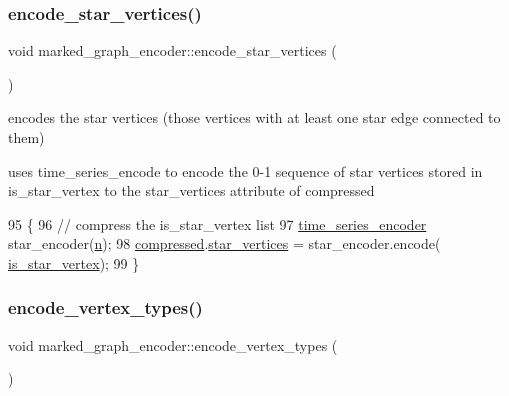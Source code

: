 \subsubsection{\texorpdfstring{encode\+\_\+star\+\_\+vertices()}{encode\_star\_vertices()}}
{\footnotesize\ttfamily void marked\+\_\+graph\+\_\+encoder\+::encode\+\_\+star\+\_\+vertices (\begin{DoxyParamCaption}{ }\end{DoxyParamCaption})\hspace{0.3cm}{\ttfamily [private]}}



encodes the star vertices (those vertices with at least one star edge connected to them) 

uses time\+\_\+series\+\_\+encode to encode the 0-\/1 sequence of star vertices stored in is\+\_\+star\+\_\+vertex to the star\+\_\+vertices attribute of compressed 
\begin{DoxyCode}
95 \{
96   \textcolor{comment}{// compress the is\_star\_vertex list}
97   \hyperlink{classtime__series__encoder}{time\_series\_encoder} star\_encoder(\hyperlink{classmarked__graph__encoder_a4c66d9fdbc14c97523715aac7e4511cb}{n});
98   \hyperlink{classmarked__graph__encoder_ac2ded200860fdd2321f86dd76b28bcb3}{compressed}.\hyperlink{classmarked__graph__compressed_a7a4ced4586e2e353f9076bd447df5208}{star\_vertices} = star\_encoder.encode(
      \hyperlink{classmarked__graph__encoder_a4ce8d85a7b63aed1272ec9824710ce45}{is\_star\_vertex});
99 \}
\end{DoxyCode}
\mbox{\label{classmarked__graph__encoder_a239769085214166e09cb56de750a8d71}} 
\subsubsection{\texorpdfstring{encode\+\_\+vertex\+\_\+types()}{encode\_vertex\_types()}}
{\footnotesize\ttfamily void marked\+\_\+graph\+\_\+encoder\+::encode\+\_\+vertex\+\_\+types (\begin{DoxyParamCaption}{ }\end{DoxyParamCaption})\hspace{0.3cm}{\ttfamily [private]}}



